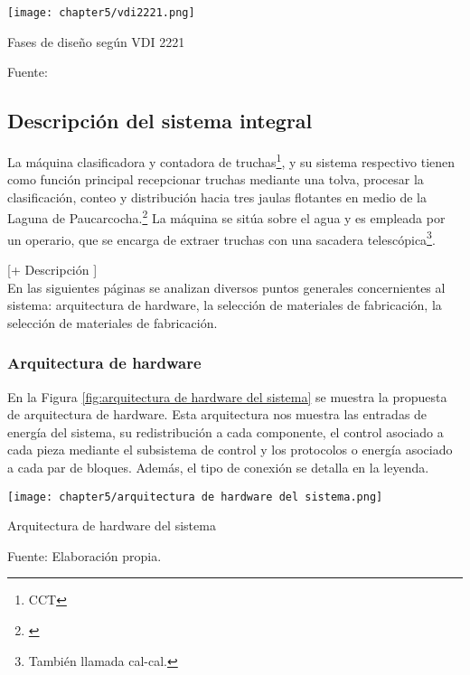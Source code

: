 \begin{myfigure}[H]
	\centering
	\texttt{[image: chapter5/vdi2221.png]}
	\caption{Fases de diseño según VDI 2221}
	\begin{myflushleftportland}
		Fuente: \cite{Pahl2007}
	\end{myflushleftportland}
	\label{fig:vdi2221}
\end{myfigure}



\subsection{Descripción del sistema integral}
\label{ssec:descripcion del sistema integral}

La máquina clasificadora y contadora de truchas\footnote{CCT}, y su sistema respectivo tienen como función principal recepcionar truchas mediante una tolva, procesar la clasificación, conteo y distribución hacia tres jaulas flotantes en medio de la Laguna de Paucarcocha.\footnote{\cite{DiazVergara2020}} La máquina se sitúa sobre el agua y es empleada por un operario, que se encarga de extraer truchas con una sacadera telescópica\footnote{También llamada cal-cal.}.

[+ Descripción ]\\

En las siguientes páginas se analizan diversos puntos generales concernientes al sistema: arquitectura de hardware, la selección de materiales de fabricación, la selección de materiales de fabricación.


\subsubsection{Arquitectura de hardware}

En la Figura \ref{fig:arquitectura de hardware del sistema} se muestra la propuesta de arquitectura de hardware. Esta arquitectura nos muestra las entradas de energía del sistema, su redistribución a cada componente, el control asociado a cada pieza mediante el subsistema de control y los protocolos o energía asociado a cada par de bloques. Además, el tipo de conexión se detalla en la leyenda.

\begin{myfigure}[H]
	\centering
	\texttt{[image: chapter5/arquitectura de hardware del sistema.png]}
	\caption{Arquitectura de hardware del sistema}
	\begin{myflushleftportland}
		Fuente: Elaboración propia.
	\end{myflushleftportland}
	\label{fig:arquitectura de hardware del sistema}
\end{myfigure}


